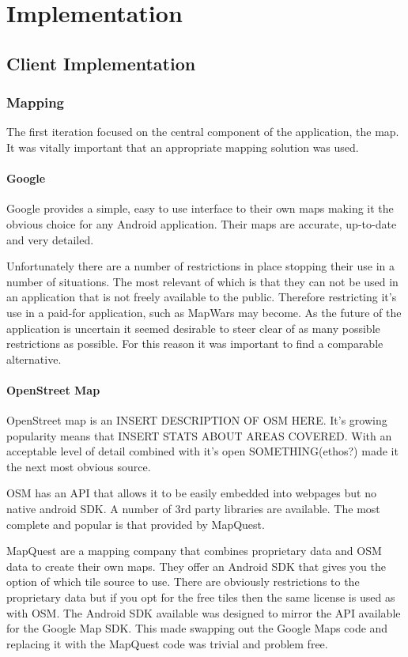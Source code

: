 \chapter{Implementation}

\section{Client Implementation}
\subsection{Mapping}
The first iteration focused on the central component of the application, the map. It was vitally important that an appropriate mapping solution was used.

\subsubsection*{Google}
Google provides a simple, easy to use interface to their own maps making it the obvious choice for any Android application. Their maps are accurate, up-to-date and very detailed.

Unfortunately there are a number of restrictions in place stopping their use in a number of situations. The most relevant of which is that they can not be used in an application that is not freely available to the public. Therefore restricting it's use in a paid-for application, such as MapWars may become. As the future of the application is uncertain it seemed desirable to steer clear of as many possible restrictions as possible. For this reason it was important to find a comparable alternative.

\subsubsection*{OpenStreet Map}
OpenStreet map is an INSERT DESCRIPTION OF OSM HERE. It's growing popularity means that INSERT STATS ABOUT AREAS COVERED. With an acceptable level of detail combined with it's open SOMETHING(ethos?) made it the next most obvious source.

OSM has an API that allows it to be easily embedded into webpages but no native android SDK. A number of 3rd party libraries are available. The most complete and popular is that provided by MapQuest.

MapQuest are a mapping company that combines proprietary data and OSM data to create their own maps. They offer an Android SDK that gives you the option of which tile source to use. There are obviously restrictions to the proprietary data but if you opt for the free tiles then the same license is used as with OSM. The Android SDK available was designed to mirror the API available for the Google Map SDK. This made swapping out the Google Maps code and replacing it with the MapQuest code was trivial and problem free.

